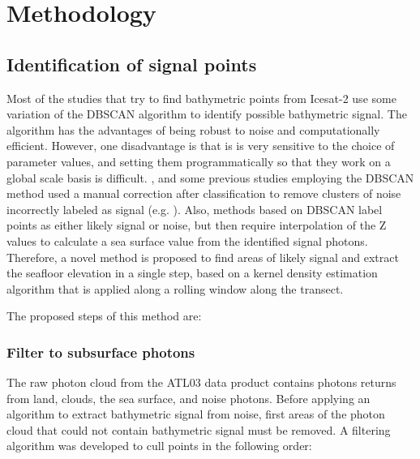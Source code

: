 \chapter{Methodology}




\section{Identification of signal points} \label{sec:kdesignalfinding}
Most of the studies that try to find bathymetric points from Icesat-2 use some variation of the DBSCAN algorithm to identify possible bathymetric signal. The algorithm has the advantages of being robust to noise \cite{} and computationally efficient. However, one disadvantage is that is is very sensitive to the choice of parameter values, and setting them programmatically so that they work on a global scale basis is difficult. , and some previous studies employing the DBSCAN method used a manual correction after classification to remove clusters of noise incorrectly labeled as signal (e.g. \cite{Ma2020}). Also, methods based on DBSCAN label points as either likely signal or noise, but then require interpolation of the Z values to calculate a sea surface value from the identified signal photons. Therefore, a novel  method is proposed to find areas of likely signal and extract the seafloor elevation in a single step, based on a kernel density estimation algorithm that is applied along a rolling window along the transect.

The proposed steps of this method are:
\subsection{Filter to subsurface photons}

The raw photon cloud from the ATL03 data product contains photons returns from land, clouds, the sea surface, and noise photons. Before applying an algorithm to extract bathymetric signal from noise, first areas of the photon cloud that could not contain bathymetric signal must be removed. A filtering algorithm was developed to cull points in the following order:

